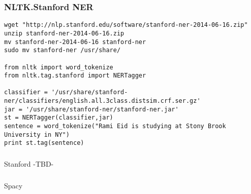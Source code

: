 
\begin{frame}[fragile]\frametitle{NLTK.Stanford NER}
  \begin{lstlisting}
wget "http://nlp.stanford.edu/software/stanford-ner-2014-06-16.zip"
unzip stanford-ner-2014-06-16.zip
mv stanford-ner-2014-06-16 stanford-ner
sudo mv stanford-ner /usr/share/

from nltk import word_tokenize
from nltk.tag.stanford import NERTagger
 
classifier = '/usr/share/stanford-ner/classifiers/english.all.3class.distsim.crf.ser.gz'
jar = '/usr/share/stanford-ner/stanford-ner.jar'
st = NERTagger(classifier,jar)
sentence = word_tokenize("Rami Eid is studying at Stony Brook University in NY")
print st.tag(sentence)
  \end{lstlisting}
\end{frame}

\begin{frame}[fragile]\frametitle{}

\begin{center}
{\Large Stanford -TBD-}
\end{center}
\end{frame}


\begin{frame}[fragile]\frametitle{}

\begin{center}
{\Large Spacy}
\end{center}
\end{frame}


